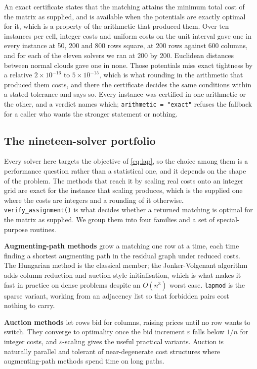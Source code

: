An exact certificate states that the matching attains the minimum total cost
of the matrix as supplied, and is available when the potentials are exactly
optimal for it, which is a property of the arithmetic that produced them. Over
ten instances per cell, integer costs and uniform costs on the unit interval
gave one in every instance at 50, 200 and 800 rows square, at 200 rows against
600 columns, and for each of the eleven solvers we ran at 200 by 200.
Euclidean distances between normal clouds gave one in none. Those potentials miss exact tightness by a relative \(2 \times 10^{-16}\) to \(5 \times 10^{-15}\),
which is what rounding in the arithmetic that produced them costs, and there
the certificate decides the same conditions within a stated tolerance and says
so. Every instance was certified in one arithmetic or the other, and a verdict
names which; \texttt{arithmetic\ =\ "exact"} refuses the fallback for a caller who
wants the stronger statement or nothing.

\subsection{The nineteen-solver portfolio}\label{the-nineteen-solver-portfolio}

Every solver here targets the objective of \eqref{eq:lap}, so the choice among
them is a performance question rather than a statistical one, and it depends on
the shape of the problem. The methods that reach it by scaling real costs onto
an integer grid are exact for the instance that scaling produces, which is the
supplied one where the costs are integers and a rounding of it otherwise. \texttt{verify\_assignment()} is what decides whether a returned matching is optimal for
the matrix as supplied. We group them into four families and a
set of special-purpose routines.

\textbf{Augmenting-path methods} grow a matching one row at a time, each time finding
a shortest augmenting path in the residual graph under reduced costs. The
Hungarian method \citep{Kuhn1955, Munkres1957} is the classical member; the
Jonker-Volgenant algorithm \citep{JonkerVolgenant1987} adds column reduction and
auction-style initialisation, which is what makes it fast in practice on dense
problems despite an \(O(n^3)\) worst case. \texttt{lapmod} is the sparse variant, working
from an adjacency list so that forbidden pairs cost nothing to carry.

\textbf{Auction methods} \citep{Bertsekas1988} let rows bid for columns, raising prices
until no row wants to switch. They converge to optimality once the bid increment
\(\varepsilon\) falls below \(1/n\) for integer costs, and \(\varepsilon\)-scaling
gives the useful practical variants. Auction is naturally parallel and tolerant
of near-degenerate cost structures where augmenting-path methods spend time on
long paths.

